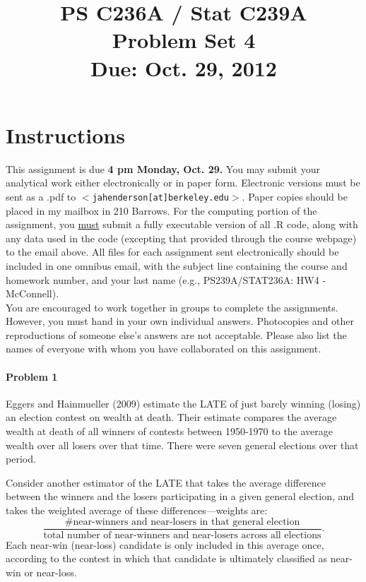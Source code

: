 \documentclass{article}
\title{PS C236A / Stat C239A \\ Problem Set 4 \\ Due: Oct. 29, 2012}
\date{}
\begin{document}
\maketitle
\vspace{-4em}
\section*{Instructions}
This assignment is due {\bf 4 pm Monday, Oct. 29.}  You may submit your
analytical work either electronically or in paper form.  Electronic
versions must be sent as a .pdf to
$<$\texttt{jahenderson[at]berkeley.edu}$>$. Paper copies should be
placed in my mailbox in 210 Barrows.  For the computing portion of the
assignment, you \underline{must} submit a fully executable version of
all .R code, along with any data used in the code (excepting that
provided through the course webpage) to the email above.  All files
for each assignment sent electronically should be included in one
omnibus email, with the subject line containing the course and
homework number, and your last name (e.g., PS239A/STAT236A: HW4 - McConnell).\\


\noindent You are encouraged to work together in groups to complete
the assignments. However, you must hand in your own individual
answers. Photocopies and other reproductions of someone else’s answers
are not acceptable. Please also list the names of everyone with
whom you have collaborated on this assignment.





\paragraph{Problem 1}
  Eggers and Hainmueller (2009) estimate the 
    LATE of just barely winning (losing) an election contest on wealth at death. 
    Their estimate compares the average wealth at death of
    all winners of contests between 1950-1970
    to the average wealth over all losers over that time.   There were seven general elections over that period. 

\vspace{1em}
\noindent 
 Consider another estimator of the LATE that takes the average difference 
   between the winners and the losers participating in a given general election, 
   and takes the weighted average of these differences---weights are:
   $$
     \frac{\#\text{near-winners and near-losers in that general election}}
      {\text{total number of near-winners and near-losers across all elections}}.
   $$
   Each near-win (near-loss) candidate is only included in this average once, according
   to the contest in which that candidate is ultimately classified as near-win or near-loss.
   
\end{document}
